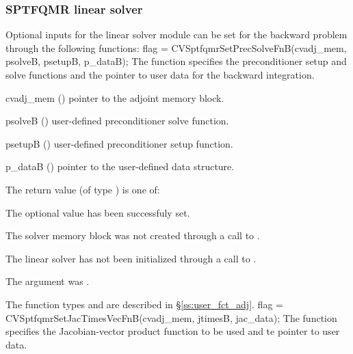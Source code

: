 \subsubsection{SPTFQMR linear solver}
Optional inputs for the {\cvsptfqmr} linear solver module can be set for the backward
problem through the following functions:
{
  flag = CVSptfqmrSetPrecSolveFnB(cvadj\_mem, psolveB, psetupB, p\_dataB);
}
{
  The function  specifies the preconditioner
  setup and solve functions and the pointer to user data for the backward integration.
}
{
  \begin{args}
  \item[cvadj\_mem] ()
    pointer to the adjoint memory block.
  \item[psolveB] ()
    user-defined preconditioner solve function.
  \item[psetupB] ()
    user-defined preconditioner setup function.
  \item[p\_dataB] ()
     pointer to the user-defined data structure.
  \end{args}
}
{
  The return value  (of type ) is one of:
  \begin{args}
  \item[\Id{CVSPGMR\_SUCCESS}] 
    The optional value has been successfuly set.
  \item[\Id{CVSPGMR\_MEM\_NULL}]
    The {\cvodes} solver memory block was not created through a call to .
  \item[\Id{CVSPGMR\_LMEM\_NULL}]
    The {\cvsptfqmr} linear solver has not been initialized through a call to .
  \item[\Id{CVSPGMR\_ADJMEM\_NULL}]
    The  argument was .
  \end{args}
}
{
   The function types  and  are
   described in \S\ref{ss:user_fct_adj}.
}
{
  flag = CVSptfqmrSetJacTimesVecFnB(cvadj\_mem, jtimesB, jac\_data);
}
{
  The function  specifies the Jacobian-vector 
  product function to be used and te pointer to user data.
}
